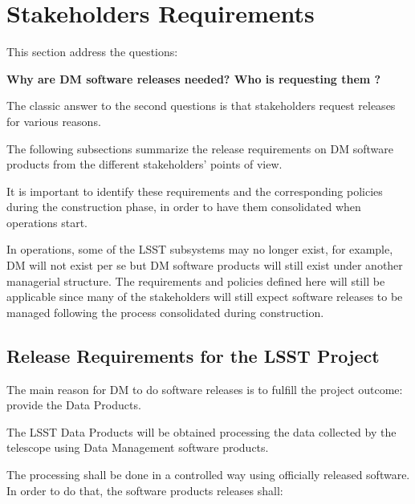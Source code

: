 \section{Stakeholders Requirements} \label{sec:reqs}

This section address the questions:

\textbf{Why are DM software releases needed? Who is requesting them ?}

The classic answer to the second questions is that  stakeholders request releases for various reasons.

The following subsections summarize the release requirements on \gls{DM} software products from the different stakeholders' points of view.

It is important to identify these requirements and the corresponding policies during the construction phase, in order to have them consolidated when operations start.

In operations, some of the \gls{LSST} subsystems may no longer exist, for example, \gls{DM} will not exist per se but \gls{DM} software products will still exist under another managerial structure.
The requirements and policies defined here will still be applicable since many of the stakeholders will still expect software releases to be managed following the process consolidated during construction.


\subsection{Release Requirements for the \gls{LSST} Project} \label{sec:lsstreqs}

The main reason for DM to do software releases is to fulfill the project outcome: provide the Data Products.

The LSST Data Products will be obtained processing the data collected by the telescope using Data Management software products.

The processing shall be done in a controlled way using officially released software.
In order to do that, the software products releases shall:

